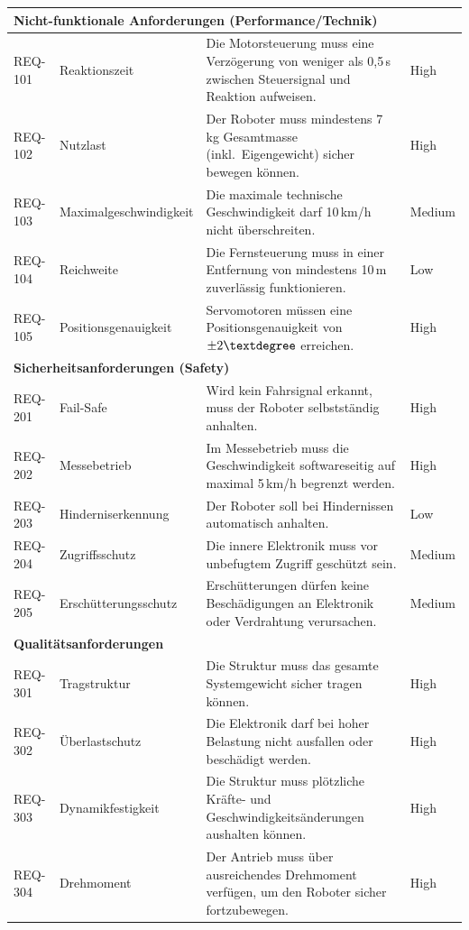 \begin{longtable}{|p{1.7cm}|p{4.2cm}|p{8.8cm}|p{1.9cm}|}
	\multicolumn{4}{|l|}{\textbf{Nicht-funktionale Anforderungen (Performance/Technik)}} \\
	\hline
	REQ-101 & Reaktionszeit & Die Motorsteuerung muss eine Verzögerung von weniger als 0{,}5\,s zwischen Steuersignal und Reaktion aufweisen. & High \\
	\hline
	REQ-102 & Nutzlast & Der Roboter muss mindestens 7\,kg Gesamtmasse (inkl.\ Eigengewicht) sicher bewegen können. & High \\
	\hline
	REQ-103 & Maximalgeschwindigkeit & Die maximale technische Geschwindigkeit darf 10\,km/h nicht überschreiten. & Medium \\
	\hline
	REQ-104 & Reichweite & Die Fernsteuerung muss in einer Entfernung von mindestens 10\,m zuverlässig funktionieren. & Low \\
	\hline
	REQ-105 & Positionsgenauigkeit & Servomotoren müssen eine Positionsgenauigkeit von \(\pm 2\textdegree\) erreichen. & High \\
	\hline
	
	\multicolumn{4}{|l|}{\textbf{Sicherheitsanforderungen (Safety)}} \\
	\hline
	REQ-201 & Fail-Safe & Wird kein Fahrsignal erkannt, muss der Roboter selbstständig anhalten. & High \\
	\hline
	REQ-202 & Messebetrieb & Im Messebetrieb muss die Geschwindigkeit softwareseitig auf maximal 5\,km/h begrenzt werden. & High \\
	\hline
	REQ-203 & Hinderniserkennung & Der Roboter soll bei Hindernissen automatisch anhalten. & Low \\
	\hline
	REQ-204 & Zugriffsschutz & Die innere Elektronik muss vor unbefugtem Zugriff geschützt sein. & Medium \\
	\hline
	REQ-205 & Erschütterungsschutz & Erschütterungen dürfen keine Beschädigungen an Elektronik oder Verdrahtung verursachen. & Medium \\
	\hline
	
	\multicolumn{4}{|l|}{\textbf{Qualitätsanforderungen}} \\
	\hline
	REQ-301 & Tragstruktur & Die Struktur muss das gesamte Systemgewicht sicher tragen können. & High \\
	\hline
	REQ-302 & Überlastschutz & Die Elektronik darf bei hoher Belastung nicht ausfallen oder beschädigt werden. & High \\
	\hline
	REQ-303 & Dynamikfestigkeit & Die Struktur muss plötzliche Kräfte- und Geschwindigkeitsänderungen aushalten können. & High \\
	\hline
	REQ-304 & Drehmoment & Der Antrieb muss über ausreichendes Drehmoment verfügen, um den Roboter sicher fortzubewegen. & High \\
	\hline
	

\end{longtable}
